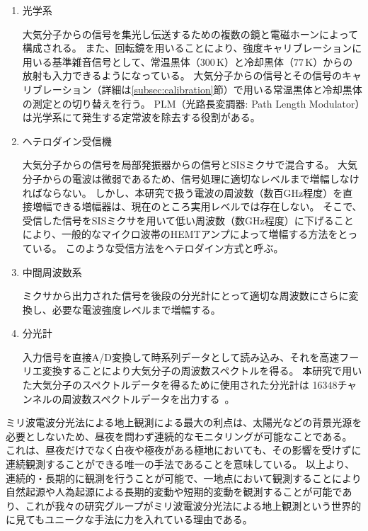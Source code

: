 \begin{enumerate}
    \item 光学系 \par
        大気分子からの信号を集光し伝送するための複数の鏡と電磁ホーンによって構成される。
        また、回転鏡を用いることにより、強度キャリブレーションに用いる基準雑音信号として、常温黒体（$300\, \mathrm{K}$）と冷却黒体（$77\, \mathrm{K}$）からの放射も入力できるようになっている。
        大気分子からの信号とその信号のキャリブレーション（詳細は\ref{subsec:calibration}節）で用いる常温黒体と冷却黒体の測定との切り替えを行う。
        PLM（光路長変調器: Path Length Modulator）は光学系にて発生する定常波を除去する役割がある。
    \item ヘテロダイン受信機 \par
        大気分子からの信号を局部発振器からの信号とSISミクサで混合する。
        大気分子からの電波は微弱であるため、信号処理に適切なレベルまで増幅しなければならない。
        しかし、本研究で扱う電波の周波数（数百GHz程度）を直接増幅できる増幅器は、現在のところ実用レベルでは存在しない。
        そこで、受信した信号をSISミクサを用いて低い周波数（数GHz程度）に下げることにより、一般的なマイクロ波帯のHEMTアンプによって増幅する方法をとっている。
        このような受信方法をヘテロダイン方式と呼ぶ。
    \item 中間周波数系 \par
        ミクサから出力された信号を後段の分光計にとって適切な周波数にさらに変換し、必要な電波強度レベルまで増幅する。
    \item 分光計 \par
        入力信号を直接A/D変換して時系列データとして読み込み、それを高速フーリエ変換することにより大気分子の周波数スペクトルを得る。
        本研究で用いた大気分子のスペクトルデータを得るために使用された分光計は
        16348チャンネルの周波数スペクトルデータを出力する~\cite{ito2017master}。
\end{enumerate} \par
ミリ波電波分光法による地上観測による最大の利点は、太陽光などの背景光源を必要としないため、昼夜を問わず連続的なモニタリングが可能なことである。
これは、昼夜だけでなく白夜や極夜がある極地においても、その影響を受けずに連続観測することができる唯一の手法であることを意味している。
以上より、連続的・長期的に観測を行うことが可能で、一地点において観測することにより自然起源や人為起源による長期的変動や短期的変動を観測することが可能であり、これが我々の研究グループがミリ波電波分光法による地上観測という世界的に見てもユニークな手法に力を入れている理由である。

